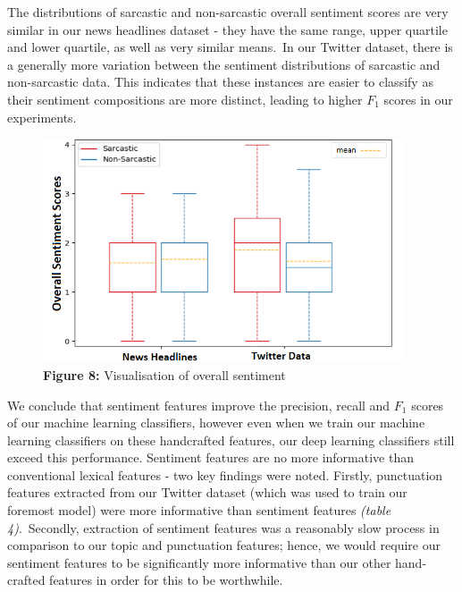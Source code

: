 \documentclass[12pt,a4paper]{article}
\begin{document}
\vspace{-13pt}\hspace{-18pt}\begin{minipage}{0.5\textwidth}
	The distributions of sarcastic and non-sarcastic overall sentiment scores are very similar in our news headlines dataset - they have the same range, upper quartile and lower quartile, as well as very similar means.\ In our Twitter dataset, there is a generally more variation between the sentiment distributions of sarcastic and non-sarcastic data. This indicates that these instances are easier to classify as their sentiment compositions are more distinct, leading to higher $F_1$ scores in our experiments.
\end{minipage}\hspace{10pt}
\begin{minipage}{0.46\textwidth}
	\vspace{-10pt}\begin{figure}[H]
		\begin{center}
			\includegraphics[width=0.95\textwidth]{Images/boxcompare.png}\\
			\textbf{Figure 8:} Visualisation of overall sentiment\\
		\end{center}
	\end{figure}
\end{minipage}

\noindent We conclude that sentiment features improve the precision, recall and $F_1$ scores of our machine learning classifiers, however even when we train our machine learning classifiers on these handcrafted features, our deep learning classifiers still exceed this performance. Sentiment features are no more informative than conventional lexical features - two key findings were noted. Firstly, punctuation features extracted from our Twitter dataset (which was used to train our foremost model) were more informative than sentiment features \textit{(table 4)}.\ Secondly, extraction of sentiment features was a reasonably slow process in comparison to our topic and punctuation features; hence, we would require our sentiment features to be significantly more informative than our other hand-crafted features in order for this to be worthwhile.
\end{document}
